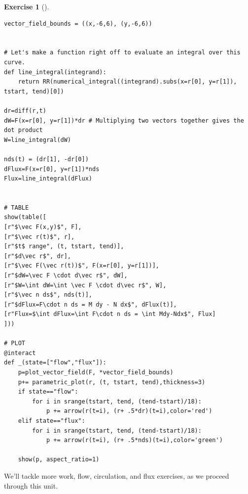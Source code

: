 \documentclass[10pt,]{book}
\theoremstyle{plain}
\theoremstyle{definition}
\theoremstyle{definition}
\theoremstyle{definition}
\theoremstyle{definition}
\newtheorem{exploration}[project]{Exercise}
\theoremstyle{definition}
\numberwithin{equation}{section}
\begin{document}
\begin{exploration}[]
\begin{enumerate}[font=\bfseries,label=(\alph*),ref=\alph*]
\begin{enumerate}[font=\bfseries,label=(\roman*),ref=\theenumi.\roman*]
\begin{lstlisting}[style=sageinput]
vector_field_bounds = ((x,-6,6), (y,-6,6))


# Let's make a function right off to evaluate an integral over this curve.
def line_integral(integrand):
    return RR(numerical_integral((integrand).subs(x=r[0], y=r[1]), tstart, tend)[0])

dr=diff(r,t)
dW=F(x=r[0], y=r[1])*dr # Multiplying two vectors together gives the dot product
W=line_integral(dW)

nds(t) = (dr[1], -dr[0])
dFlux=F(x=r[0], y=r[1])*nds
Flux=line_integral(dFlux)


# TABLE
show(table([
[r"$\vec F(x,y)$", F],
[r"$\vec r(t)$", r],
[r"$t$ range", (t, tstart, tend)],
[r"$d\vec r$", dr],
[r"$\vec F(\vec r(t))$", F(x=r[0], y=r[1])],
[r"$dW=\vec F \cdot d\vec r$", dW],
[r"$W=\int dW=\int \vec F \cdot d\vec r$", W],
[r"$\vec n ds$", nds(t)],
[r"$dFlux=F\cdot n ds = M dy - N dx$", dFlux(t)],
[r"Flux=$\int dFlux=\int F\cdot n ds = \int Mdy-Ndx$", Flux]
]))

# PLOT
@interact
def _(state=["flow","flux"]):
    p=plot_vector_field(F, *vector_field_bounds)
    p+= parametric_plot(r, (t, tstart, tend),thickness=3)
    if state=="flow":
        for i in srange(tstart, tend, (tend-tstart)/18):
            p += arrow(r(t=i), (r+ .5*dr)(t=i),color='red')
    elif state=="flux":
        for i in srange(tstart, tend, (tend-tstart)/18):
            p += arrow(r(t=i), (r+ .5*nds)(t=i),color='green')
    
    show(p, aspect_ratio=1)
\end{lstlisting}
\end{enumerate}
\end{enumerate}
\end{exploration}
We'll tackle more work, flow, circulation, and flux exercises, as we proceed through this unit.%
\typeout{************************************************}
\typeout{************************************************}
\end{document}
